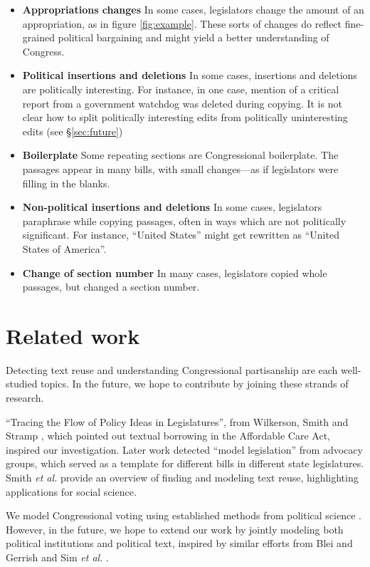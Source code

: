 \documentclass{article}
\begin{document}
\begin{itemize}
    \item \textbf{Appropriations changes} In some cases, legislators change the amount of an appropriation, as in figure \ref{fig:example}. These sorts of changes do reflect fine-grained political bargaining and might yield a better understanding of Congress.
    \item \textbf{Political insertions and deletions} In some cases, insertions and deletions are politically interesting. For instance, in one case, mention of a critical report from a government watchdog was deleted during copying. It is not clear how to split politically interesting edits from politically uninteresting edits (see \S\ref{sec:future})
    \item \textbf{Boilerplate} Some repeating sections are Congressional boilerplate. The passages appear in many bills, with small changes---as if legislators were filling in the blanks.
    \item \textbf{Non-political insertions and deletions} In some cases, legislators paraphrase while copying passages, often in ways which are not politically significant. For instance, ``United States'' might get rewritten as ``United States of America''.
    \item \textbf{Change of section number} In many cases, legislators copied whole passages, but changed a section number. 
\end{itemize}

\section{Related work}\label{sec:related_work}
Detecting text reuse and understanding Congressional partisanship are each well-studied topics. In the future, we hope to contribute by joining these strands of research. 

``Tracing the Flow of Policy Ideas in Legislatures'', from Wilkerson, Smith and Stramp \cite{Wilkerson2013TracingTF}, which pointed out textual borrowing in the Affordable Care Act, inspired our investigation. Later work \cite{Burgess2016TheLI} detected ``model legislation'' from advocacy groups, which served as a template for different bills in different state legislatures. Smith \textit{et al.} \cite{Smith2014DetectingAM} provide an overview of finding and modeling text reuse, highlighting applications for social science.

We model Congressional voting using established methods from political science \cite{mccarty2011measuring} \cite{carroll2009comparing} \cite{martin2002dynamic}. However, in the future, we hope to extend our work by jointly modeling both political institutions and political text, inspired by similar efforts from Blei and Gerrish \cite{gerrish2011predicting} \cite{gerrish2012they} and Sim \textit{et al.} \cite{simfriends}.
\end{document}
